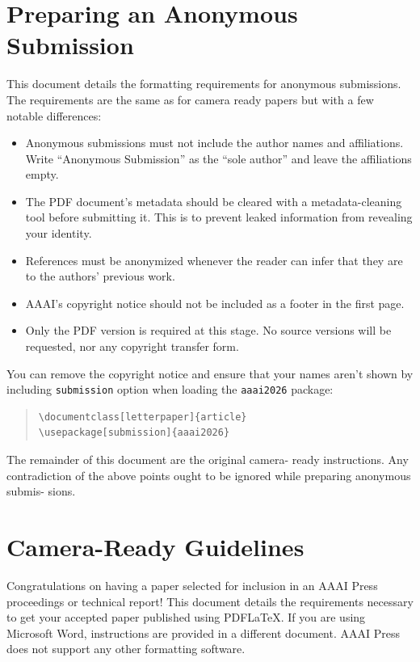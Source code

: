 
\section{Preparing an Anonymous Submission}

This document details the formatting requirements for anonymous submissions. The requirements are the same as for camera ready papers but with a few notable differences:

\begin{itemize}
    \item Anonymous submissions must not include the author names and affiliations. Write ``Anonymous Submission'' as the ``sole author'' and leave the affiliations empty.
    \item The PDF document's metadata should be cleared with a metadata-cleaning tool before submitting it. This is to prevent leaked information from revealing your identity.
    \item References must be anonymized whenever the reader can infer that they are to the authors' previous work.
    \item AAAI's copyright notice should not be included as a footer in the first page.
    \item Only the PDF version is required at this stage. No source versions will be requested, nor any copyright transfer form.
\end{itemize}

You can remove the copyright notice and ensure that your names aren't shown by including \texttt{submission} option when loading the \texttt{aaai2026} package:

\begin{quote}\begin{scriptsize}\begin{verbatim}
\documentclass[letterpaper]{article}
\usepackage[submission]{aaai2026}
\end{verbatim}\end{scriptsize}\end{quote}

The remainder of this document are the original camera-
ready instructions. Any contradiction of the above points
ought to be ignored while preparing anonymous submis-
sions.

\section{Camera-Ready Guidelines}

Congratulations on having a paper selected for inclusion in an AAAI Press proceedings or technical report! This document details the requirements necessary to get your accepted paper published using PDF\LaTeX{}. If you are using Microsoft Word, instructions are provided in a different document. AAAI Press does not support any other formatting software.

